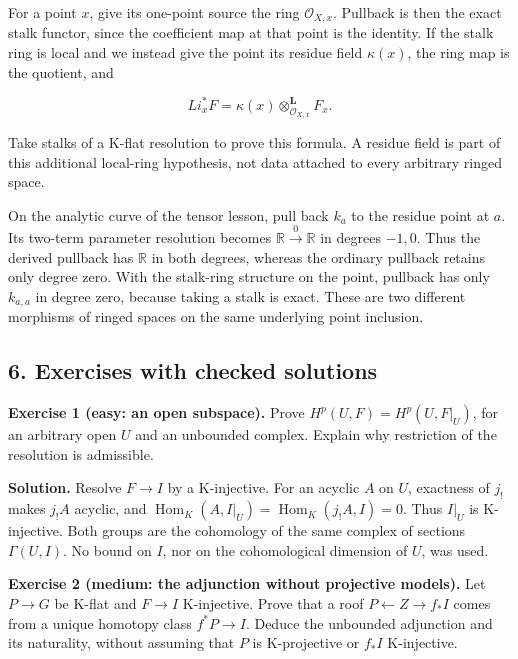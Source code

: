 \documentclass[
  english,
  11pt,
  a4paper,
]{article}
\begin{document}
For a point \(x\), give its one-point source the ring
\(\mathcal O_{X,x}\). Pullback is then the exact stalk functor, since
the coefficient map at that point is the identity. If the stalk ring is
local and we instead give the point its residue field \(\kappa(x)\), the
ring map is the quotient, and

\[Li_x^*F=\kappa(x)\otimes_{\mathcal O_{X,x}}^{\mathbf L}F_x.
\tag{5.2}\]

Take stalks of a K-flat resolution to prove this formula. A residue
field is part of this additional local-ring hypothesis, not data
attached to every arbitrary ringed space.

On the analytic curve of the tensor lesson, pull back \(k_a\) to the
residue point at \(a\). Its two-term parameter resolution becomes
\(\mathbb R\xrightarrow{0}\mathbb R\) in degrees \(-1,0\). Thus the
derived pullback has \(\mathbb R\) in both degrees, whereas the ordinary
pullback retains only degree zero. With the stalk-ring structure on the
point, pullback has only \(k_{a,a}\) in degree zero, because taking a
stalk is exact. These are two different morphisms of ringed spaces on
the same underlying point inclusion.

\subsection{6. Exercises with checked
solutions}\label{derived-pullback-and-pushforward--6-exercises-with-checked-solutions}

\textbf{Exercise 1 (easy: an open subspace).} Prove
\(H^p(U,F)=H^p(U,F|_U)\), for an arbitrary open \(U\) and an unbounded
complex. Explain why restriction of the resolution is admissible.

\textbf{Solution.} Resolve \(F\to I\) by a K-injective. For an acyclic
\(A\) on \(U\), exactness of \(j_!\) makes \(j_!A\) acyclic, and
\(\operatorname{Hom}_K(A,I|_U)=\operatorname{Hom}_K(j_!A,I)=0\). Thus
\(I|_U\) is K-injective. Both groups are the cohomology of the same
complex of sections \(\Gamma(U,I)\). No bound on \(I\), nor on the
cohomological dimension of \(U\), was used.

\textbf{Exercise 2 (medium: the adjunction without projective models).}
Let \(P\to G\) be K-flat and \(F\to I\) K-injective. Prove that a roof
\(P\leftarrow Z\to f_*I\) comes from a unique homotopy class
\(f^*P\to I\). Deduce the unbounded adjunction and its naturality,
without assuming that \(P\) is K-projective or \(f_*I\) K-injective.
\end{document}

